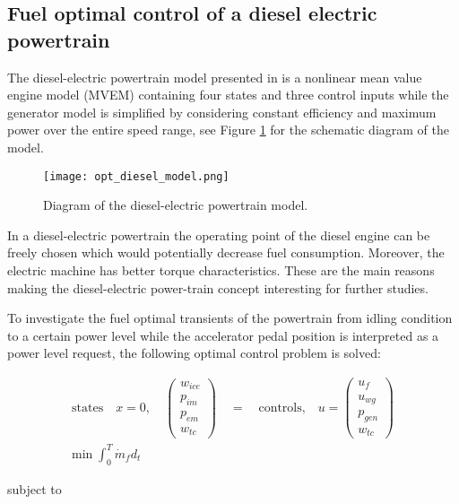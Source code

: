 \subsection{Fuel optimal control of a diesel electric powertrain}
\label{sec:optimizationdiesel}

The diesel-electric powertrain model presented in \cite{sivertsson,bernhard} is a nonlinear
mean value engine model (MVEM) containing four states and three control inputs while the generator model is
simplified by considering constant efficiency and maximum power over the entire speed range, see Figure \ref{fig:dieselmodel} for the
schematic diagram of the model.

\begin{figure}
	\texttt{[image: opt\_diesel\_model.png]}
	\caption{Diagram of the diesel-electric powertrain model.}
	\label{fig:dieselmodel}
\end{figure}

In a diesel-electric powertrain the operating point of the diesel engine can be freely chosen which would potentially
decrease fuel consumption. Moreover, the electric machine has better torque characteristics. These are the main reasons
making the diesel-electric power-train concept interesting for further studies.

To investigate the fuel optimal transients of the powertrain from idling condition to a certain power level while the
accelerator pedal position is interpreted as a power level request, the following optimal control problem is solved:

\begin{equation*}
 \begin{aligned}
	\text{states}\quad x = 0, \quad \begin{pmatrix} w_{ice} \\ p_{im} \\p_{em} \\w_{tc}  \end{pmatrix}\quad = \quad \text{controls,}\quad u = \begin{pmatrix} u_{f} \\ u_{wg} \\p_{gen} \\w_{tc}  \end{pmatrix} \\
	\text{min}\;\int_{0}^{T}\dot{m}{_f} d_t
\end{aligned}
\end{equation*}

subject to

